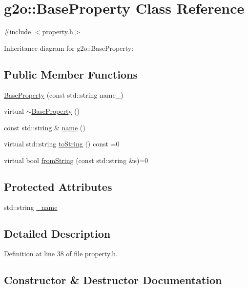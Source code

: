 \hypertarget{classg2o_1_1BaseProperty}{}\section{g2o\+:\+:Base\+Property Class Reference}
\label{classg2o_1_1BaseProperty}


{\ttfamily \#include $<$property.\+h$>$}



Inheritance diagram for g2o\+:\+:Base\+Property\+:
\subsection*{Public Member Functions}
\begin{DoxyCompactItemize}
\item 
\hyperlink{classg2o_1_1BaseProperty_a00444ab7926d86beb9e66550e40e5d97}{Base\+Property} (const std\+::string name\+\_\+)
\item 
virtual \hyperlink{classg2o_1_1BaseProperty_acf2a5de9ce5781187fbf6be447918f39}{$\sim$\+Base\+Property} ()
\item 
const std\+::string \& \hyperlink{classg2o_1_1BaseProperty_aae91313b0eb376dd9460cd712ecbb86d}{name} ()
\item 
virtual std\+::string \hyperlink{classg2o_1_1BaseProperty_a7a4191088468c2f03dab52107d130833}{to\+String} () const =0
\item 
virtual bool \hyperlink{classg2o_1_1BaseProperty_aeabc313d9f66a403738aece884c85e1d}{from\+String} (const std\+::string \&s)=0
\end{DoxyCompactItemize}
\subsection*{Protected Attributes}
\begin{DoxyCompactItemize}
\item 
std\+::string \hyperlink{classg2o_1_1BaseProperty_a74e4bbf35ddf26022cb39be2ea7abd2b}{\+\_\+name}
\end{DoxyCompactItemize}


\subsection{Detailed Description}


Definition at line 38 of file property.\+h.



\subsection{Constructor \& Destructor Documentation}

